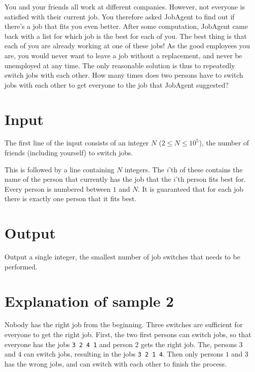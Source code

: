 You and your friends all work at different companies.
However, not everyone is satisfied with their current job.
You therefore asked JobAgent to find out if there's a job that fits you even better.
After some computation, JobAgent came back with a list for which job is the best for each of you.
The best thing is that each of you are already working at one of these jobs!
As the good employees you are, you would never want to leave a job without a replacement, and never be unemployed at any time.
The only reasonable solution is thus to repeatedly switch jobs with each other.
How many times does two persons have to switch jobs with each other to get everyone to the job that JobAgent suggested?

\section*{Input}
The first line of the input consists of an integer $N$ ($2 \le N \le 10^5$), the number of friends (including yourself) to switch jobs.

This is followed by a line containing $N$ integers.
The $i$'th of these contains the name of the person that currently has the job that the $i$'th person fits best for.
Every person is numbered between $1$ and $N$.
It is guaranteed that for each job there is exactly one person that it fits best.

\section*{Output}
Output a single integer, the smallest number of job switches that needs to be performed.

\section*{Explanation of sample 2}
Nobody has the right job from the beginning.
Three switches are sufficient for everyone to get the right job.
First, the two first persons can switch jobs, so that everyone has the jobs \texttt{3 2 4 1} and person $2$ gets the right job.
The, persons $3$ and $4$ can switch jobs, resulting in the jobs \texttt{3 2 1 4}.
Then only persons $1$ and $3$ has the wrong jobs, and can switch with each other to finish the process.
